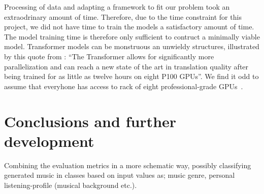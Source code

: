 \documentclass{IEEEtran}
\begin{document}
Processing of data and adapting a framework to fit our problem 
took an extraodrinary amount of time. Therefore, due to the time constraint
for this project, we did not have time to train the models a satisfactory
amount of time. The model training time is therefore only sufficient to 
contruct a minimally viable model. Transformer models can be monstruous 
an unwieldy structures, illustrated by this quote from
\citeauthor{vaswani2017attention}: ``The Transformer allows for significantly
more parallelization and can reach a new state of the art in translation
quality after being trained for as little as twelve hours on eight P100 GPUs''.
We find it odd to assume that everyhone has access to rack of eight 
professional-grade GPUs~\cite{vaswani2017attention}.

\section{Conclusions and further development}

Combining the evaluation
metrics in a more schematic way, possibly classifying generated music in
classes based on input values as; music genre, personal listening-profile
(musical background etc.).

\vspace{3em}

\printbibliography
\end{document}
